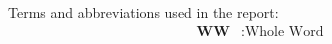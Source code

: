 
Terms and abbreviations used in the report:
\begin{align*}
    \textbf{WW} &: \text{Whole Word} \\
\end{align*}